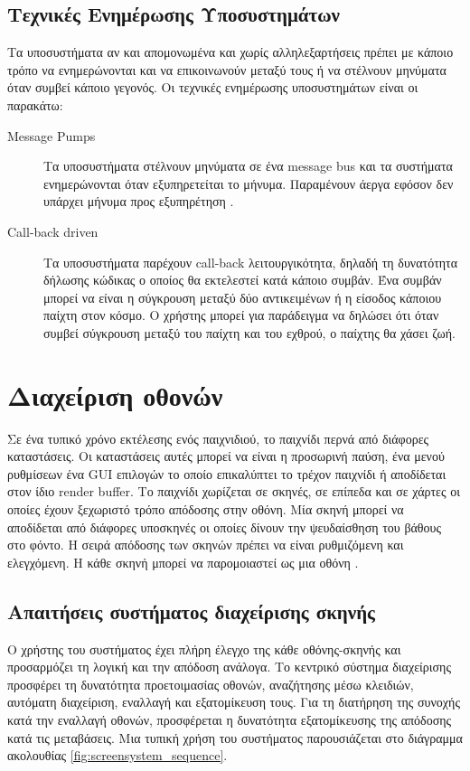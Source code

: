 	\subsection{Τεχνικές Ενημέρωσης Υποσυστημάτων}
	Τα υποσυστήματα αν και απομονωμένα και χωρίς αλληλεξαρτήσεις πρέπει με κάποιο τρόπο να ενημερώνονται και να επικοινωνούν μεταξύ τους ή να στέλνουν μηνύματα όταν συμβεί κάποιο γεγονός. Οι τεχνικές ενημέρωσης υποσυστημάτων είναι οι παρακάτω:
	\begin{description}
	\item [Message Pumps] Τα υποσυστήματα στέλνουν μηνύματα σε ένα message bus και τα συστήματα ενημερώνονται όταν εξυπηρετείται το μήνυμα. Παραμένουν άεργα εφόσον δεν υπάρχει μήνυμα προς εξυπηρέτηση \cite{Erl:2009:SDP:1538586}.
	\item [Call-back driven] Tα υποσυστήματα παρέχουν call-back λειτουργικότητα, δηλαδή τη δυνατότητα δήλωσης κώδικας ο οποίος θα εκτελεστεί κατά κάποιο συμβάν. Ένα συμβάν μπορεί να είναι η σύγκρουση μεταξύ δύο αντικειμένων ή η είσοδος κάποιου παίχτη στον κόσμο. Ο χρήστης μπορεί για παράδειγμα να δηλώσει ότι όταν συμβεί σύγκρουση μεταξύ του παίχτη και του εχθρού, ο παίχτης θα χάσει ζωή.
	\end{description}
		
	\section{Διαχείριση οθονών}
	Σε ένα τυπικό χρόνο εκτέλεσης ενός παιχνιδιού, το παιχνίδι περνά από διάφορες καταστάσεις. Οι καταστάσεις αυτές μπορεί να είναι η προσωρινή παύση, ένα μενού ρυθμίσεων ένα \gls{GUI} επιλογών το οποίο επικαλύπτει το τρέχον παιχνίδι ή αποδίδεται στον ίδιο render buffer. Το παιχνίδι χωρίζεται σε σκηνές, σε επίπεδα και σε χάρτες οι οποίες έχουν ξεχωριστό τρόπο απόδοσης στην οθόνη. Μία σκηνή μπορεί να αποδίδεται από διάφορες υποσκηνές οι οποίες δίνουν την ψευδαίσθηση του βάθους στο φόντο. Η σειρά απόδοσης των σκηνών πρέπει να είναι ρυθμιζόμενη και ελεγχόμενη. Η κάθε σκηνή μπορεί να παρομοιαστεί ως μια οθόνη \cite{sanja14}.

	\subsection{Απαιτήσεις συστήματος διαχείρισης σκηνής}
	Ο χρήστης του συστήματος έχει πλήρη έλεγχο της κάθε οθόνης-σκηνής και προσαρμόζει τη λογική και την απόδοση ανάλογα. Το κεντρικό σύστημα διαχείρισης προσφέρει τη δυνατότητα προετοιμασίας οθονών, αναζήτησης μέσω κλειδιών, αυτόματη διαχείριση, εναλλαγή και εξατομίκευση τους. Για τη διατήρηση της συνοχής κατά την εναλλαγή οθονών, προσφέρεται η δυνατότητα εξατομίκευσης της απόδοσης κατά τις μεταβάσεις. Μια τυπική χρήση του συστήματος παρουσιάζεται στο διάγραμμα ακολουθίας \ref{fig:screensystem_sequence}.

